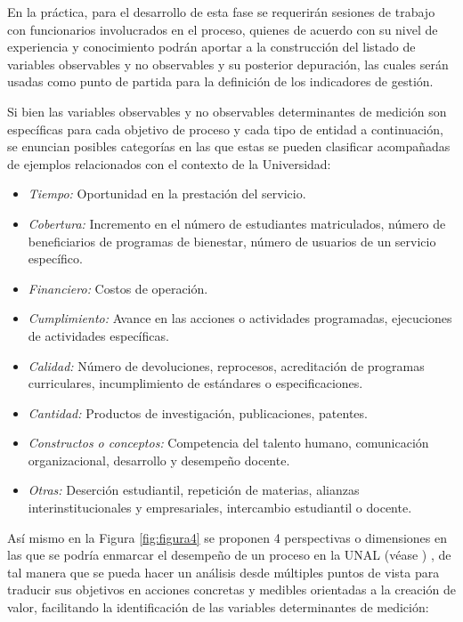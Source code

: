 \documentclass[
]{book}
\begin{document}
En la práctica, para el desarrollo de esta fase se requerirán sesiones de trabajo con funcionarios involucrados en el proceso, quienes de acuerdo con su nivel de experiencia y conocimiento podrán aportar a la construcción del listado de variables observables y no observables y su posterior depuración, las cuales serán usadas como punto de partida para la definición de los indicadores de gestión.

Si bien las variables observables y no observables determinantes de medición son específicas para cada objetivo de proceso y cada tipo de entidad a continuación, se enuncian posibles categorías en las que estas se pueden clasificar acompañadas de ejemplos relacionados con el contexto de la Universidad:

\begin{itemize}
\item
  \emph{Tiempo:} Oportunidad en la prestación del servicio.
\item
  \emph{Cobertura:} Incremento en el número de estudiantes matriculados, número de beneficiarios de programas de bienestar, número de usuarios de un servicio específico.
\item
  \emph{Financiero:} Costos de operación.
\item
  \emph{Cumplimiento:} Avance en las acciones o actividades programadas, ejecuciones de actividades específicas.
\item
  \emph{Calidad:} Número de devoluciones, reprocesos, acreditación de programas curriculares, incumplimiento de estándares o especificaciones.
\item
  \emph{Cantidad:} Productos de investigación, publicaciones, patentes.
\item
  \emph{Constructos o conceptos:} Competencia del talento humano, comunicación organizacional, desarrollo y desempeño docente.
\item
  \emph{Otras:} Deserción estudiantil, repetición de materias, alianzas interinstitucionales y empresariales, intercambio estudiantil o docente.
\end{itemize}

Así mismo en la Figura \ref{fig:figura4} se proponen 4 perspectivas o dimensiones en las que se podría enmarcar el desempeño de un proceso en la UNAL (véase \citet{bolborici2012aplicacion}) , de tal manera que se pueda hacer un análisis desde múltiples puntos de vista para traducir sus objetivos en acciones concretas y medibles orientadas a la creación de valor, facilitando la identificación de las variables determinantes de medición:
\end{document}

